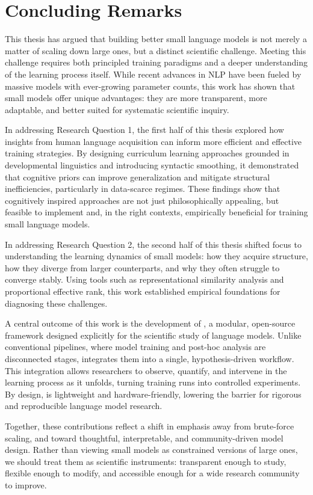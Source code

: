 \chapter{Concluding Remarks}
This thesis has argued that building better small language models is not merely a matter of scaling down large ones, but a distinct scientific challenge. Meeting this challenge requires both principled training paradigms and a deeper understanding of the learning process itself. While recent advances in NLP have been fueled by massive models with ever-growing parameter counts, this work has shown that small models offer unique advantages: they are more transparent, more adaptable, and better suited for systematic scientific inquiry.

In addressing Research Question 1, the first half of this thesis explored how insights from human language acquisition can inform more efficient and effective training strategies. By designing curriculum learning approaches grounded in developmental linguistics and introducing syntactic smoothing, it demonstrated that cognitive priors can improve generalization and mitigate structural inefficiencies, particularly in data-scarce regimes. These findings show that cognitively inspired approaches are not just philosophically appealing, but feasible to implement and, in the right contexts, empirically beneficial for training small language models.

In addressing Research Question 2, the second half of this thesis shifted focus to understanding the learning dynamics of small models: how they acquire structure, how they diverge from larger counterparts, and why they often struggle to converge stably. Using tools such as representational similarity analysis and proportional effective rank, this work established empirical foundations for diagnosing these challenges.

A central outcome of this work is the development of \pico, a modular, open-source framework designed explicitly for the scientific study of language models. Unlike conventional pipelines, where model training and post-hoc analysis are disconnected stages, \pico integrates them into a single, hypothesis-driven workflow. This integration allows researchers to observe, quantify, and intervene in the learning process as it unfolds, turning training runs into controlled experiments. By design, \pico is lightweight and hardware-friendly, lowering the barrier for rigorous and reproducible language model research.

Together, these contributions reflect a shift in emphasis away from brute-force scaling, and toward thoughtful, interpretable, and community-driven model design. Rather than viewing small models as constrained versions of large ones, we should treat them as scientific instruments: transparent enough to study, flexible enough to modify, and accessible enough for a wide research community to improve.